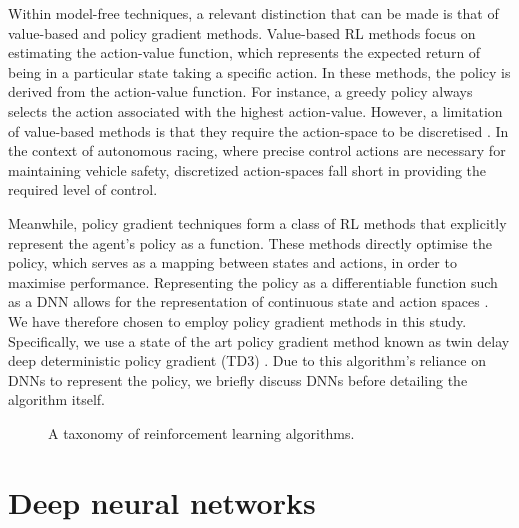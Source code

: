 Within model-free techniques, a relevant distinction that can be made is that of value-based and policy gradient methods.
Value-based RL methods  focus on estimating the action-value function, which represents the expected return of being in a particular state taking a specific action.
In these methods, the policy is derived from the action-value function.
For instance, a greedy policy always selects the action associated with the highest action-value.
However, a limitation of value-based methods is that they require the action-space to be discretised \cite{sutton2020}.
In the context of autonomous racing, where precise control actions are necessary for maintaining vehicle safety, discretized action-spaces fall short in providing the required level of control.

Meanwhile, policy gradient techniques form a class of RL methods that explicitly represent the agent's policy as a function.
These methods directly optimise the policy, which serves as a mapping between states and actions, in order to maximise performance.
Representing the policy as a differentiable function such as a DNN allows for the representation of continuous state and action spaces \cite{silver2014}.
We have therefore chosen to employ policy gradient methods in this study.
Specifically, we use a state of the art policy gradient method known as twin delay deep deterministic policy gradient (TD3) \cite{Fujimoto2018}.
Due to this algorithm's reliance on DNNs to represent the policy, we briefly discuss DNNs before detailing the algorithm itself.


\begin{figure}[htb!]
    \centering
    
    \caption[A taxonomy of reinforcement learning algorithms]{A taxonomy of reinforcement learning algorithms.}
    \label{fig:RL:taxonomy}
\end{figure}











\section{Deep neural networks}\label{sec:dnns}


